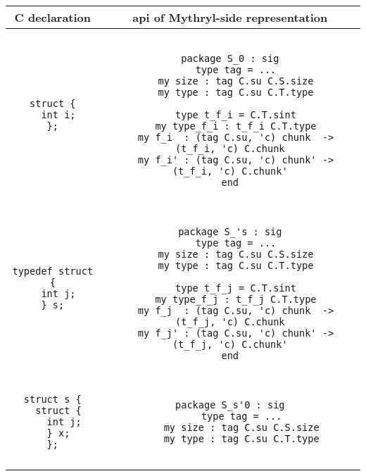 \begin{small}
\begin{center}
\begin{tabular}{c|c}
C declaration & api of Mythryl-side representation \\ \hline\hline
\begin{minipage}{2in}
\begin{verbatim}
struct {
  int i;
};
\end{verbatim}
\end{minipage}
&
\begin{minipage}{4in}
\begin{verbatim}

package S_0 : sig
  type tag = ...
  my size : tag C.su C.S.size
  my type : tag C.su C.T.type

  type t_f_i = C.T.sint
  my type_f_i : t_f_i C.T.type
  my f_i  : (tag C.su, 'c) chunk  -> (t_f_i, 'c) C.chunk
  my f_i' : (tag C.su, 'c) chunk' -> (t_f_i, 'c) C.chunk'
end

\end{verbatim}
\end{minipage}  
\\ \hline
\begin{minipage}{2in}
\begin{verbatim}
typedef struct {
  int j;
} s;
\end{verbatim}
\end{minipage}
&
\begin{minipage}{4in}
\begin{verbatim}

package S_'s : sig
  type tag = ...
  my size : tag C.su C.S.size
  my type : tag C.su C.T.type

  type t_f_j = C.T.sint
  my type_f_j : t_f_j C.T.type
  my f_j  : (tag C.su, 'c) chunk  -> (t_f_j, 'c) C.chunk
  my f_j' : (tag C.su, 'c) chunk' -> (t_f_j, 'c) C.chunk'
end

\end{verbatim}
\end{minipage}  
\\ \hline
\begin{minipage}{2in}
\begin{verbatim}
struct s {
  struct {
    int j;
  } x;
};
\end{verbatim}
\end{minipage}
&
\begin{minipage}{4in}
\begin{verbatim}

package S_s'0 : sig
    type tag = ...
    my size : tag C.su C.S.size
    my type : tag C.su C.T.type


\end{verbatim}
\end{minipage}
\end{tabular}
\end{center}
\end{small}
